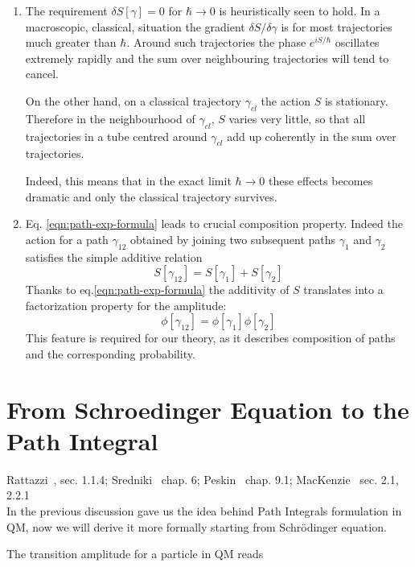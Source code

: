 \documentclass[../main/main.tex]{subfiles}
\begin{document}
\begin{enumerate}
\item The requirement $\delta S[\gamma]=0$ for $\hbar\to0$ is heuristically seen to hold. In a macroscopic, classical, situation the gradient $\delta S/\delta\gamma$ is for most trajectories much greater than $\hbar$. Around such trajectories the phase $e^{iS/\hbar}$ oscillates extremely rapidly and the sum over neighbouring trajectories will tend to cancel. 

On the other hand, on a classical trajectory $\gamma_{cl}$ the action $S$ is stationary. Therefore in the neighbourhood of $\gamma_{cl}$, $S$ varies very little, so that all trajectories in a tube centred around $\gamma_{cl}$ add up coherently in the sum over trajectories. 

Indeed, this means that in the exact limit $\hbar\to0$ these effects becomes dramatic and only the classical trajectory survives.

\item Eq. \eqref{eqn:path-exp-formula} leads to crucial composition property. Indeed the action for a path $\gamma_{12}$ obtained by joining two subsequent paths $\gamma_1$ and $\gamma_2$ satisfies the simple additive relation
\[S[\gamma_{12}]=S[\gamma_1]+S[\gamma_2]\]
Thanks to eq.\eqref{eqn:path-exp-formula} the additivity of $S$ translates into a factorization property for the amplitude:
\[\phi[\gamma_{12}]=\phi[\gamma_1]\phi[\gamma_2]\]
This feature is required for our theory, as it describes composition of paths and the corresponding probability.

\end{enumerate}


\section{From Schroedinger Equation to the Path Integral}
\textsf{Rattazzi~\cite{Rattazzi:2011aa}, sec. 1.1.4; Sredniki~\cite{Srednicki:2007aa} chap. 6; Peskin~\cite{Peskin:1995aa} chap. 9.1; MacKenzie~\cite{MacKenzie:2000aa} sec. 2.1, 2.2.1}\\

In the previous discussion gave us the idea behind Path Integrals formulation in QM, now we will derive it more formally starting from Schrödinger equation. 

The transition amplitude for a particle in QM reads
\end{document}
